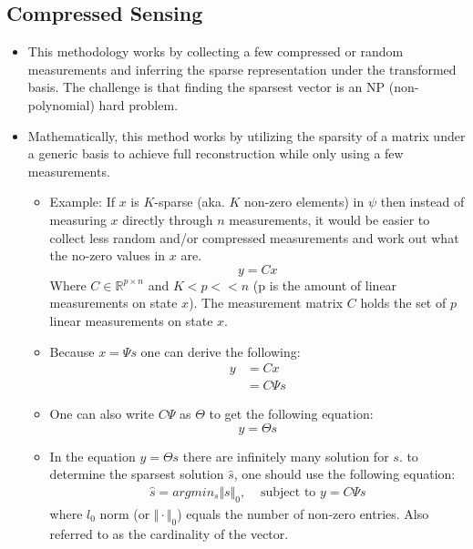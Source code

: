 \documentclass[11.5pt,a4paper]{article}
\begin{document}
\newpage
\subsection*{Compressed Sensing}

\begin{itemize}
    \item This methodology works by collecting a few compressed or random measurements and inferring the sparse representation under the transformed basis. The challenge is that finding the sparsest vector is an NP (non-polynomial) hard problem.
    \item Mathematically, this method works by utilizing the sparsity of a matrix under a generic basis to achieve full reconstruction while only using a few measurements.
    \begin{itemize}
        \item Example: If $x$ is $K$-sparse (aka. $K$ non-zero elements) in $\psi$ then instead of measuring $x$ directly through $n$ measurements, it would be easier to collect less random and/or compressed measurements and work out what the no-zero values in $x$ are.
        \begin{equation*}
            y = Cx
        \end{equation*}
        Where $C \in \mathbb{R}^{p\times n}$ and $K < p << n$ (p is the amount of linear measurements on state $x$). The measurement matrix $C$ holds the set of $p$ linear measurements on state $x$.
        \item Because $x = \Psi s$ one can derive the following:
        \begin{align*}
            y &= Cx \\ 
            &= C\Psi s
        \end{align*}
        \item One can also write $C\Psi$ as $\Theta$ to get the following equation:
        \begin{equation*}
            y = \Theta s
        \end{equation*}
        \item In the equation $y = \Theta s$ there are infinitely many solution for $s$. to determine the sparsest solution $\hat s$, one should use the following equation:
        \begin{align*}
            \hat s = argmin_s \Vert s \Vert_0, & \text{ subject to } y= C\Psi s
        \end{align*}
        where $l_0$ norm (or $\Vert \cdot \Vert_0$) equals the number of non-zero entries. Also referred to as the cardinality of the vector.

\end{itemize}
\end{itemize}
\end{document}
